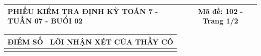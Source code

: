 \documentclass[12pt,a4paper]{article}
\begin{document}
\newpage


\noindent
\begin{tabularx}{\linewidth}{|X|c|}
\hline
\textbf{PHIẾU KIỂM TRA ĐỊNH KỲ TOÁN 7 - TUẦN 07 - BUỔI 02} & \textbf{Mã đề: 102 - Trang 1/2} \\
\hline
\end{tabularx}

\vspace{1.2mm}

\noindent
\begin{tabularx}{\linewidth}{|p{3.2cm}|X|}
\hline
\centering\textbf{ĐIỂM SỐ} & \centering\textbf{LỜI NHẬN XÉT CỦA THẦY CÔ} \tabularnewline
\hline
\rule{0pt}{1.8cm} & \tabularnewline
\hline
\end{tabularx}

\vspace{1.5mm}
\end{document}
